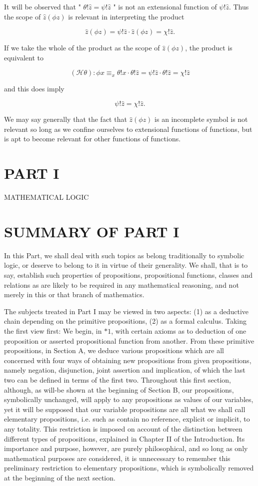 \documentclass[10pt]{article}
\begin{document}
It will be observed that " $\theta!\hat{z}=\psi!\hat{z}$ " is not an extensional function of $\psi!\hat{z}$. Thus the scope of $\hat{z}(\phi z)$ is relevant in interpreting the product

$$
\hat{z}(\phi z)=\psi!\hat{z} \cdot \hat{z}(\phi z)=\chi!\hat{z} .
$$

If we take the whole of the product as the scope of $\hat{z}(\phi z)$, the product is equivalent to

$$
(\mathcal{H} \theta): \phi x \equiv_{x} \theta!x \cdot \theta!\hat{z}=\psi!\hat{z} \cdot \theta!\hat{z}=\chi!\hat{z}
$$

and this does imply

$$
\psi!\hat{z}=\chi!\hat{z} .
$$

We may say generally that the fact that $\hat{z}(\phi z)$ is an incomplete symbol is not relevant so long as we confine ourselves to extensional functions of functions, but is apt to become relevant for other functions of functions.

\section*{PART I}
MATHEMATICAL LOGIC

\section*{SUMMARY OF PART I}
In this Part, we shall deal with such topics as belong traditionally to symbolic logic, or deserve to belong to it in virtue of their generality. We shall, that is to say, establish such properties of propositions, propositional functions, classes and relations as are likely to be required in any mathematical reasoning, and not merely in this or that branch of mathematics.

The subjects treated in Part I may be viewed in two aspects: (1) as a deductive chain depending on the primitive propositions, (2) as a formal calculus. Taking the first view first: We begin, in $* 1$, with certain axioms as to deduction of one proposition or asserted propositional function from another. From these primitive propositions, in Section A, we deduce various propositions which are all concerned with four ways of obtaining new propositions from given propositions, namely negation, disjunction, joint assertion and implication, of which the last two can be defined in terms of the first two. Throughout this first section, although, as will-be shown at the beginning of Section B, our propositions, symbolically unchanged, will apply to any propositions as values of our variables, yet it will be supposed that our variable propositions are all what we shall call elementary propositions, i.e. such as contain no reference, explicit or implicit, to any totality. This restriction is imposed on account of the distinction between different types of propositions, explained in Chapter II of the Introduction. Its importance and purpose, however, are purely philosophical, and so long as only mathematical purposes are considered, it is unnecessary to remember this preliminary restriction to elementary propositions, which is symbolically removed at the beginning of the next section.
\end{document}
